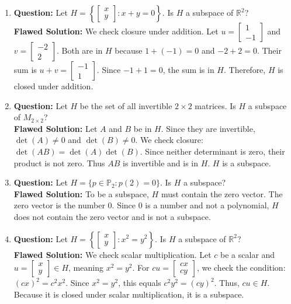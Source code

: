 \documentclass[11pt]{article}
\begin{document}
\begin{enumerate}[resume]
    \item \textbf{Question:} Let $H = \left\{ \begin{bmatrix} x \\ y \end{bmatrix} : x+y = 0 \right\}$. Is $H$ a subspace of $\mathbb{R}^2$? \\
    \textbf{Flawed Solution:} We check closure under addition. Let $u = \begin{bmatrix} 1 \\ -1 \end{bmatrix}$ and $v = \begin{bmatrix} -2 \\ 2 \end{bmatrix}$. Both are in $H$ because $1+(-1)=0$ and $-2+2=0$. Their sum is $u+v = \begin{bmatrix} -1 \\ 1 \end{bmatrix}$. Since $-1+1=0$, the sum is in $H$. Therefore, $H$ is closed under addition.
    
    \item \textbf{Question:} Let $H$ be the set of all invertible $2 \times 2$ matrices. Is $H$ a subspace of $M_{2\times 2}$? \\
    \textbf{Flawed Solution:} Let $A$ and $B$ be in $H$. Since they are invertible, $\det(A) \neq 0$ and $\det(B) \neq 0$. We check closure: $\det(AB) = \det(A)\det(B)$. Since neither determinant is zero, their product is not zero. Thus $AB$ is invertible and is in $H$. $H$ is a subspace.
    
    \item \textbf{Question:} Let $H = \{ p \in \mathbb{P}_2 : p(2) = 0 \}$. Is $H$ a subspace? \\
    \textbf{Flawed Solution:} To be a subspace, $H$ must contain the zero vector. The zero vector is the number $0$. Since $0$ is a number and not a polynomial, $H$ does not contain the zero vector and is not a subspace.
    
    \item \textbf{Question:} Let $H = \left\{ \begin{bmatrix} x \\ y \end{bmatrix} : x^2 = y^2 \right\}$. Is $H$ a subspace of $\mathbb{R}^2$? \\
    \textbf{Flawed Solution:} We check scalar multiplication. Let $c$ be a scalar and $u = \begin{bmatrix} x \\ y \end{bmatrix} \in H$, meaning $x^2 = y^2$. For $cu = \begin{bmatrix} cx \\ cy \end{bmatrix}$, we check the condition: $(cx)^2 = c^2x^2$. Since $x^2=y^2$, this equals $c^2y^2 = (cy)^2$. Thus, $cu \in H$. Because it is closed under scalar multiplication, it is a subspace.
\end{enumerate}
\end{document}
